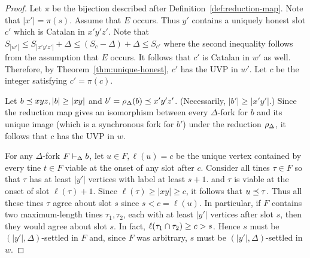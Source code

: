 \begin{proof}
  Let $\pi$ be the bijection described after Definition~\ref{def:reduction-map}.
  Note that $|x'| = \pi(s)$. 
  Assume that $E$ occurs. 
  Thus $y'$ contains a uniquely honest slot $c'$ which is Catalan in $x'y'z'$. 
  Note that $S_{|w'|} \leq S_{|x'y'z'|} + \Delta \leq (S_{c} - \Delta) + \Delta \leq S_{c'}$ 
  where the second inequality follows from the assumption that $E$ occurs. 
  It follows that $c'$ is Catalan in $w'$ as well. 
  Therefore, 
  by Theorem~\ref{thm:unique-honest}, 
  $c'$ has the UVP in $w'$.     
  Let $c$ be the integer satisfying $c' = \pi(c)$. 

  Let $b \preceq xyz, |b| \geq |xy|$ and $b' = \rho_\Delta(b) \preceq x'y'z'$. 
  (Necessarily, $|b'| \geq |x'y'|$.)
  Since the reduction map gives an isomorphism between every 
  $\Delta$-fork for $b$ and 
  its unique image (which is a synchronous fork for $b'$) 
  under the reduction $\rho_\Delta$, 
  it follows that $c$ has the UVP in $w$. 

  For any $\Delta$-fork $F \vdash_\Delta b$, 
  let $u \in F, \ell(u) = c$ be 
  the unique vertex contained by every tine 
  $t \in F$ viable at the onset of any slot after $c$. 
  Consider all tines $\tau \in F$ so that 
  $\tau$ has at least $|y'|$ vertices with label at least $s + 1$.
  and $\tau$ is viable at the onset of slot $\ell(\tau) + 1$. 
  Since $\ell(\tau) \geq |xy| \geq c$, 
  it follows that $u \preceq \tau$. 
  Thus all these tines $\tau$ 
  agree about slot $s$ since $s < c = \ell(u)$. 
  In particular, if $F$ contains two maximum-length tines $\tau_1, \tau_2$, 
  each with at least $|y'|$ vertices after slot $s$, 
  then they would agree about slot $s$. 
  In fact, $\ell(\tau_1 \cap \tau_2) \geq c > s$. 
  Hence $s$ must be $(|y'|, \Delta)$-settled in $F$ and, 
  since $F$ was arbitrary, 
  $s$ must be $(|y'|, \Delta)$-settled in $w$. 
\end{proof}




